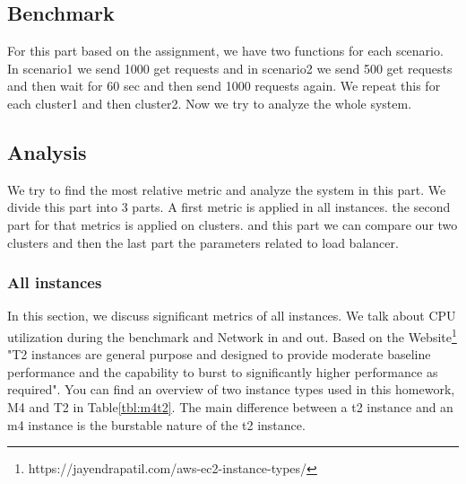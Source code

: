 \documentclass[12pt]{article}
\begin{document}
        \subsection{Benchmark}
         For this part based on the assignment, we have two functions for each scenario. In scenario1 we send 1000 get requests and in scenario2 we send 500 get requests and then wait for 60 sec and then send 1000 requests again. We repeat this for each cluster1 and then cluster2. Now we try to analyze the whole system. 

         \subsection{Analysis}
            We try to find the most relative metric and analyze the system in this part. We divide this part into 3 parts. A first metric is applied in all instances. the second part for that metrics is applied on clusters. and this part we can compare our two clusters and then the last part the parameters related to load balancer.

        

        \subsubsection{All instances}
        In this section, we discuss significant metrics of all instances. We talk about CPU utilization during the benchmark and Network in and out. 
         Based on the Website\footnote{https://jayendrapatil.com/aws-ec2-instance-types/} "T2 instances are general purpose and designed to provide moderate baseline performance and the capability to burst to significantly higher performance as required". You can find an overview of two instance types used in this homework, M4 and T2 in Table\ref{tbl:m4t2}. The main difference between a t2 instance and an m4 instance is the burstable nature of the t2 instance.\\
        
\end{document}
